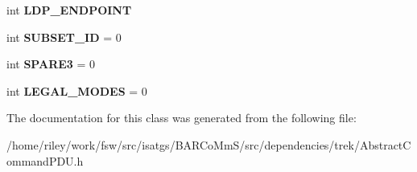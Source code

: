\begin{DoxyCompactItemize}
\item 
int {\bfseries L\+D\+P\+\_\+\+E\+N\+D\+P\+O\+I\+NT}\hypertarget{classisat__trek_1_1_abstract_command_p_d_u_a613a9b40729913785ae3e0ec78b994e7}{}\label{classisat__trek_1_1_abstract_command_p_d_u_a613a9b40729913785ae3e0ec78b994e7}

\item 
int {\bfseries S\+U\+B\+S\+E\+T\+\_\+\+ID} = 0\hypertarget{classisat__trek_1_1_abstract_command_p_d_u_a562f4c11df5603e18ced9870d99c60ba}{}\label{classisat__trek_1_1_abstract_command_p_d_u_a562f4c11df5603e18ced9870d99c60ba}

\item 
int {\bfseries S\+P\+A\+R\+E3} = 0\hypertarget{classisat__trek_1_1_abstract_command_p_d_u_a98d45cf4066b501e101487e9dad7fb14}{}\label{classisat__trek_1_1_abstract_command_p_d_u_a98d45cf4066b501e101487e9dad7fb14}

\item 
int {\bfseries L\+E\+G\+A\+L\+\_\+\+M\+O\+D\+ES} = 0\hypertarget{classisat__trek_1_1_abstract_command_p_d_u_a35ceaaa29261e315e3ae291221d42ff9}{}\label{classisat__trek_1_1_abstract_command_p_d_u_a35ceaaa29261e315e3ae291221d42ff9}

\end{DoxyCompactItemize}


The documentation for this class was generated from the following file\+:\begin{DoxyCompactItemize}
\item 
/home/riley/work/fsw/src/isatgs/\+B\+A\+R\+Co\+Mm\+S/src/dependencies/trek/Abstract\+Command\+P\+D\+U.\+h\end{DoxyCompactItemize}
